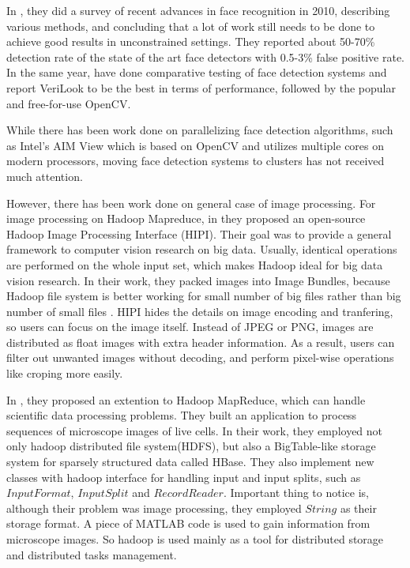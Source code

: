 \documentclass[11pt, draftclsnofoot, onecolumn]{IEEEtran}
\begin{document}
In \cite{MSR2010}, they did a survey of recent advances in face recognition in 2010, describing various methods, and concluding that a lot of work still needs to be done to achieve good results in unconstrained settings. They reported about 50-70\% detection rate of the state of the art face detectors with 0.5-3\% false positive rate. In the same year, \cite{TSU2010} have done comparative testing of face detection systems and report VeriLook to be the best in terms of performance, followed by the popular and free-for-use OpenCV.

While there has been work done on parallelizing face detection algorithms, such as Intel's AIM View \cite{IC2012} which is based on OpenCV and utilizes multiple cores on modern processors, moving face detection systems to clusters has not received much attention. 

However, there has been work done on general case of image processing. For image processing on Hadoop Mapreduce, in \cite{sweeney2011hipi} they proposed an open-source Hadoop Image Processing Interface (HIPI). Their goal was to provide a general framework to computer vision research on big data. Usually, identical operations are performed on the whole input set, which makes Hadoop ideal for big data vision research. In their work, they packed images into Image Bundles, because Hadoop file system is better working for small number of big files rather than big number of small files \cite{sweeney2011hipi}. HIPI hides the details on image encoding and tranfering, so users can focus on the image itself. Instead of JPEG or PNG, images are distributed as float images with extra header information. As a result, users can filter out unwanted images without decoding, and perform pixel-wise operations like croping more easily. 

In \cite{zhang2010case}, they proposed an extention to Hadoop MapReduce, which can handle scientific data processing problems. They built an application to process sequences of microscope images of live cells. In their work, they employed not only hadoop distributed file system(HDFS), but also a BigTable-like storage system for sparsely structured data called HBase. They also implement new classes with hadoop interface for handling input and input splits, such as $InputFormat$, $InputSplit$ and $RecordReader$. Important thing to notice is, although their problem was image processing, they employed $String$ as their storage format. A piece of MATLAB code is used to gain information from microscope images. So hadoop is used mainly as a tool for distributed storage and distributed tasks management.
\end{document}
